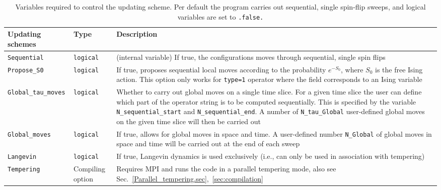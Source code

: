 \begin{table}[h]
	\begin{tabular}{@{} p{} p{} p{} @{}}
		\toprule
		Updating schemes             & Type             & Description \\
		\midrule
		\texttt{Sequential}          & \texttt{logical} & (internal variable) If true, the configurations moves through sequential, single spin flips  \\
		\texttt{Propose\_S0}         & \texttt{logical} & If true, proposes sequential local moves according to the probability $e^{-S_0}$, where $S_0$ is the free Ising action. This option only works for 
		  \texttt{type=1}  operator where the field corresponds to an Ising variable  \\
		\texttt{Global\_tau\_moves}  & \texttt{logical} & Whether to carry out  global moves on a single time slice.
		For a given time slice the user can define which part of the operator string is to be computed sequentially. This is specified by the  variable  \texttt{N\_sequential\_start} and \texttt{N\_sequential\_end}. A number of   \texttt{N\_tau\_Global} user-defined global moves on the given time slice  will then be carried out   \\
		\texttt{Global\_moves}       & \texttt{logical} & If true, allows for global moves in space and time.   A user-defined number \texttt{N\_Global} of global moves in space and time  will be carried out at the end of each sweep \\
		\texttt{Langevin}            & \texttt{logical} & If true, Langevin dynamics is used exclusively (i.e., can only be used in association with tempering) \\
		\texttt{Tempering}           & Compiling option & Requires MPI and runs the code in a parallel tempering mode, also see Sec.~\ref{Parallel_tempering.sec},~\ref{sec:compilation} \\
		\bottomrule
	\end{tabular}
	\caption{Variables required to control the updating scheme. Per default the program carries out sequential, single spin-flip sweeps, and logical variables are set to \texttt{.false.}}
	\label{table:Updating_schemes}
\end{table}
% 


